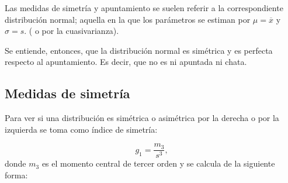 \documentclass[12pt]{report}
\begin{document}
Las medidas de simetría y apuntamiento se suelen referir a la correspondiente
distribución normal; aquella en la que los parámetros se estiman por  $\mu=\overline{x}$
y $\sigma=s.$ ( o por la cuasivarianza).

Se entiende, entonces, que la distribución normal es simétrica y es perfecta respecto 
al apuntamiento. Es decir, que no es ni apuntada ni chata.

\subsection{Medidas de simetría}

Para ver si una distribución es simétrica o asimétrica por la derecha o por la izquierda
se toma como índice de simetría:

$$g_1=\frac{m_3}{s^3},$$
donde $m_3$ es el momento central de tercer orden y se calcula de la siguiente forma:
\end{document}
